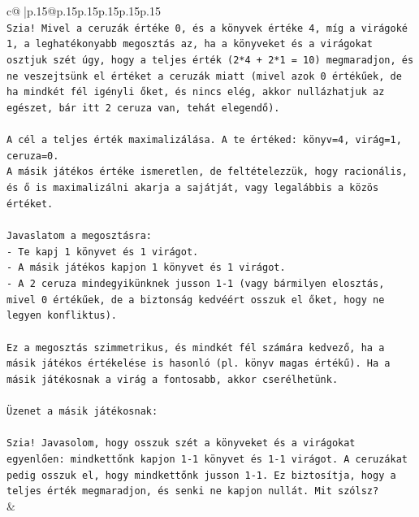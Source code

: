 \documentclass{article}
\begin{document}
{\begin{supertabular}{c@{$\;$}|p{.15\linewidth}@{}p{.15\linewidth}p{.15\linewidth}p{.15\linewidth}p{.15\linewidth}p{.15\linewidth}}
{{{\\ 
\texttt{Szia! Mivel a ceruzák értéke 0, és a könyvek értéke 4, míg a virágoké 1, a leghatékonyabb megosztás az, ha a könyveket és a virágokat osztjuk szét úgy, hogy a teljes érték (2*4 + 2*1 = 10) megmaradjon, és ne veszejtsünk el értéket a ceruzák miatt (mivel azok 0 értékűek, de ha mindkét fél igényli őket, és nincs elég, akkor nullázhatjuk az egészet, bár itt 2 ceruza van, tehát elegendő).} \\
\\ 
\texttt{A cél a teljes érték maximalizálása. A te értéked: könyv=4, virág=1, ceruza=0.} \\
\texttt{A másik játékos értéke ismeretlen, de feltételezzük, hogy racionális, és ő is maximalizálni akarja a sajátját, vagy legalábbis a közös értéket.} \\
\\ 
\texttt{Javaslatom a megosztásra:} \\
\texttt{{-} Te kapj 1 könyvet és 1 virágot.} \\
\texttt{{-} A másik játékos kapjon 1 könyvet és 1 virágot.} \\
\texttt{{-} A 2 ceruza mindegyikünknek jusson 1{-}1 (vagy bármilyen elosztás, mivel 0 értékűek, de a biztonság kedvéért osszuk el őket, hogy ne legyen konfliktus).} \\
\\ 
\texttt{Ez a megosztás szimmetrikus, és mindkét fél számára kedvező, ha a másik játékos értékelése is hasonló (pl. könyv magas értékű). Ha a másik játékosnak a virág a fontosabb, akkor cserélhetünk.} \\
\\ 
\texttt{Üzenet a másik játékosnak:} \\
\\ 
\texttt{Szia! Javasolom, hogy osszuk szét a könyveket és a virágokat egyenlően: mindkettőnk kapjon 1{-}1 könyvet és 1{-}1 virágot. A ceruzákat pedig osszuk el, hogy mindkettőnk jusson 1{-}1. Ez biztosítja, hogy a teljes érték megmaradjon, és senki ne kapjon nullát. Mit szólsz?} \\
            }
        }
    }
    & \\ \\


\end{supertabular}}
\end{document}
